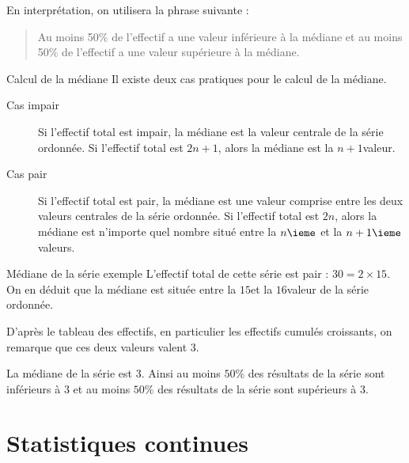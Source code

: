 \documentclass[titre=Stastistiques, classe=Troisième]{jeanmonnet}
\begin{document}
En interprétation, on utilisera la phrase suivante :
\begin{quote}
	Au moins 50\% de l'effectif a une valeur inférieure à la médiane et au moins 50\% de l'effectif a une valeur supérieure à la médiane.
\end{quote}


\begin{propriete}{Calcul de la médiane}{}
	Il existe deux cas pratiques pour le calcul de la médiane.	\begin{description}
		\item[Cas impair] Si l'effectif total est impair, la médiane est la valeur centrale de la série ordonnée. Si l'effectif total est $2n+1$, alors la médiane est la $n+1$\ieme valeur.
		\item[Cas pair] Si l'effectif total est pair, la médiane est une valeur comprise entre les deux valeurs centrales de la série ordonnée. Si l'effectif total est $2n$, alors la médiane est n'importe quel nombre situé entre la $n\ieme$ et la $n+1\ieme$ valeurs.
	\end{description}
\end{propriete}

\begin{exemple}{Médiane de la série exemple}{}
	L'effectif total de cette série est pair : $30 = 2 \times 15$. On en déduit que la médiane est située entre la $15$\ieme et la $16$\ieme valeur de la série ordonnée.
	
	D'après le tableau des effectifs, en particulier les effectifs cumulés croissants, on remarque que ces deux valeurs valent $3$. 
	
	La médiane de la série est $3$.
	Ainsi au moins $50$\% des résultats de la série sont inférieurs à $3$ et au moins $50$\% des résultats de la série sont supérieurs à $3$.
\end{exemple}

\section{Statistiques continues}

\end{document}
